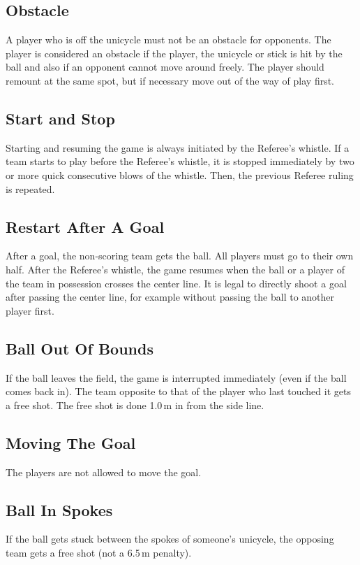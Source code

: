 \subsection{Obstacle}
A player who is off the unicycle must not be an obstacle for opponents.
The player is considered an obstacle if the player, the unicycle or stick is hit by the ball and also if an opponent cannot move around freely.
The player should remount at the same spot, but if necessary move out of the way of play first.

\subsection{Start and Stop}
Starting and resuming the game is always initiated by the Referee's whistle.
If a team starts to play before the Referee's whistle, it is stopped immediately by two or more quick consecutive blows of the whistle.
Then, the previous Referee ruling is repeated.

\subsection{Restart After A Goal}
After a goal, the non-scoring team gets the ball.
All players must go to their own half.
After the Referee's whistle, the game resumes when the ball or a player of the team in possession crosses the center line.
It is legal to directly shoot a goal after passing the center line, for example without passing the ball to another player first.

\subsection{Ball Out Of Bounds}
If the ball leaves the field, the game is interrupted immediately (even if the ball comes back in).
The team opposite to that of the player who last touched it gets a free shot.
The free shot is done 1.0\,m in from the side line.

\subsection{Moving The Goal}
The players are not allowed to move the goal.

\subsection{Ball In Spokes}
If the ball gets stuck between the spokes of someone's unicycle, the opposing team gets a free shot (not a 6.5\,m penalty).

